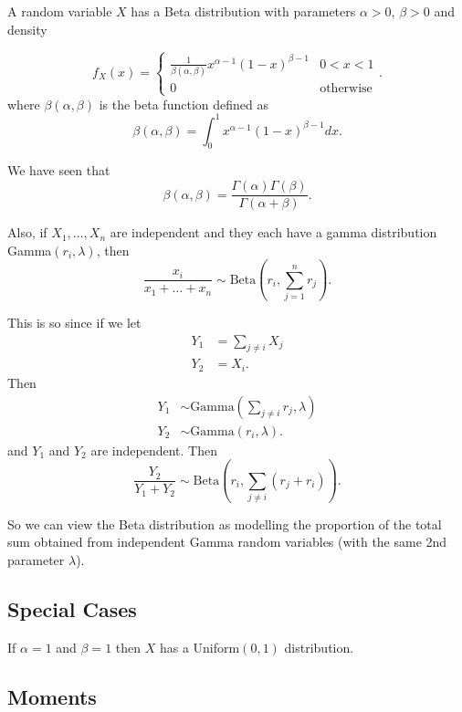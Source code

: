 
A random variable $X$ has a Beta distribution with parameters $\alpha > 0$, $\beta > 0$ and density

\[
	f_{X}\left( x \right) = \begin{cases}
		\frac{1}{\beta \left( \alpha , \beta  \right) }x^{\alpha - 1}\left( 1-x \right) ^{\beta - 1} & 0 < x < 1 \\
		0 & \text{otherwise}
	\end{cases}
.\] 
where $\beta \left( \alpha , \beta \right) $ is the beta function defined as 
\[
	\beta \left( \alpha , \beta  \right) = \int_{0}^{1} x^{\alpha - 1}\left( 1 - x  \right) ^{\beta - 1}dx 
.\] 

We have seen that 
\[
	\beta \left( \alpha, \beta  \right) = \frac{\Gamma \left( \alpha \right) \Gamma\left( \beta \right) }{\Gamma \left( \alpha + \beta \right) }
.\] 

Also, if $X_{1} , \ldots , X_{n}$ are independent and they each have a gamma distribution Gamma$\left( r_i, \lambda  \right) $, then 
\[
	\frac{x_{i}}{x_1 + \ldots + x_{n}} \sim \text{Beta}\left( r_i , \sum_{j=1}^{n} r_j \right) 
.\] 

This is so since if we let 
\begin{align*}
	Y_1&= \sum_{j \neq i} X_{j} \\
	Y_2 &= X_{i} 
.\end{align*}
Then
\begin{align*}
	Y_1 &\sim \text{Gamma}\left( \sum_{j \neq i}^{} r_{j}, \lambda \right) \\
	Y_2 &\sim  \text{Gamma}\left( r_i , \lambda \right) 
.\end{align*}
and $Y_1$ and $Y_2$ are independent. Then 
\[
	\frac{Y_2}{Y_1 + Y_2} \sim \text{Beta}\left( r_i , \sum_{j \neq i}^{ } \left( r_j + r_i \right)  \right) 
.\] 

So we can view the Beta distribution as modelling the proportion of the total sum obtained from independent Gamma random variables (with the same 2nd parameter $\lambda$).

\subsection{Special Cases}

If $\alpha = 1$ and $\beta = 1$ then $X$ has a Uniform$\left( 0, 1 \right) $ distribution.

\subsection{Moments}

